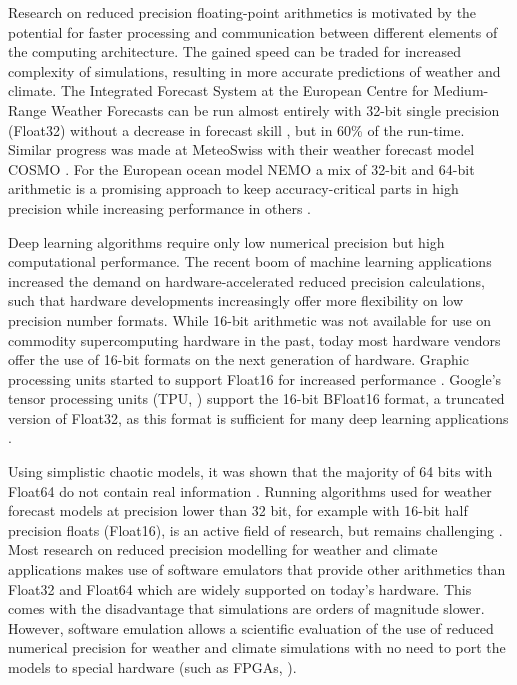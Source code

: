 \documentclass[draft]{agujournal2019}
\begin{document}
Research on reduced precision floating-point arithmetics is motivated by the potential for faster processing and communication between different elements of the computing architecture. The gained speed can be traded for increased complexity of simulations, resulting in more accurate predictions of weather and climate. The Integrated Forecast System at the European Centre for Medium-Range Weather Forecasts can be run almost entirely with 32-bit single precision (Float32) without a decrease in forecast skill \cite{Vana2017}, but in 60\% of the run-time. Similar progress was made at MeteoSwiss with their weather forecast model COSMO \cite{Rudisuhli2013}. For the European ocean model NEMO a mix of 32-bit and 64-bit arithmetic is a promising approach to keep accuracy-critical parts in high precision while increasing performance in others \cite{TintoPrims2019}.

Deep learning algorithms require only low numerical precision but high
computational performance. The recent boom of machine learning applications
increased the demand on hardware-accelerated reduced precision calculations,
such that hardware developments increasingly offer more flexibility on
low precision number formats. While 16-bit arithmetic was not available for use
on commodity supercomputing hardware in the past, today most hardware vendors
offer the use of 16-bit formats on the next generation of hardware. Graphic
processing units started to support Float16 for increased performance
\cite{Markidis2018}. Google's tensor processing units (TPU, )
support the 16-bit BFloat16 format, a truncated version of Float32, as this
format is sufficient for many deep learning applications
\cite{Kalamkar2019,Burgess2019,Gupta2015}.

Using simplistic chaotic models, it was shown that the majority of 64 bits with Float64 do not contain real information \cite{Jeffress2017}. Running algorithms used for weather forecast models at precision lower than 32 bit, for example with 16-bit half precision floats (Float16), is an active field of research, but remains challenging \cite{Duben2014,Thornes2017,Hatfield2018,Duben2018}. Most research on reduced precision modelling for weather and climate applications makes use of software emulators \cite{Dawson2017} that provide other arithmetics than Float32 and Float64 which are widely supported on today's hardware. This comes with the disadvantage that simulations are orders of magnitude slower. However, software emulation allows a scientific evaluation of the use of reduced numerical precision for weather and climate simulations with no need to port the models to special hardware (such as FPGAs, ).
\end{document}
